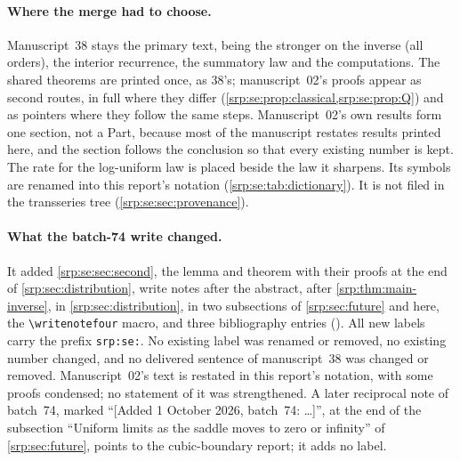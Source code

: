 \documentclass[11pt,a4paper]{article}
\numberwithin{equation}{section}
\theoremstyle{definition}
\theoremstyle{remark}
\newcommand{\writenotefour}[1]{\par\smallskip\noindent
 \textit{[Write note, batch 74, 1 October 2026.]}\ #1\par\smallskip}
\begin{document}
\paragraph{Where the merge had to choose.} Manuscript~38 stays the primary
text, being the stronger on the inverse (all orders), the interior
recurrence, the summatory law and the computations. The shared theorems
are printed once, as 38's; manuscript~02's proofs appear as second routes,
in full where they differ (\cref{srp:se:prop:classical,srp:se:prop:Q}) and
as pointers where they follow the same steps. Manuscript~02's own results
form one section, not a Part, because most of the manuscript restates
results printed here, and the section follows the conclusion so that every
existing number is kept. The rate for the log-uniform law is placed beside
the law it sharpens. Its symbols are renamed into this report's notation
(\cref{srp:se:tab:dictionary}). It is not filed in the transseries tree
(\cref{srp:se:sec:provenance}).

\paragraph{What the batch-74 write changed.} It added
\cref{srp:se:sec:second}, the lemma and theorem with their proofs at the
end of \cref{srp:sec:distribution}, write notes after the abstract, after
\cref{srp:thm:main-inverse}, in \cref{srp:sec:distribution}, in two
subsections of \cref{srp:sec:future} and here, the \verb|\writenotefour|
macro, and three bibliography entries
(\cite{seSzekeresI,seSzekeresII,seProveIt}). All new labels carry the
prefix \texttt{srp:se:}. No existing label was renamed or removed, no
existing number changed, and no delivered sentence of manuscript~38 was
changed or removed. Manuscript~02's text is restated in this report's
notation, with some proofs condensed; no statement of it was
strengthened. A later reciprocal note of batch~74, marked
``[Added 1 October 2026, batch~74: \dots]'', at the end of the subsection
``Uniform limits as the saddle moves to zero or infinity'' of
\cref{srp:sec:future}, points to the cubic-boundary report; it adds no
label.
\end{document}

